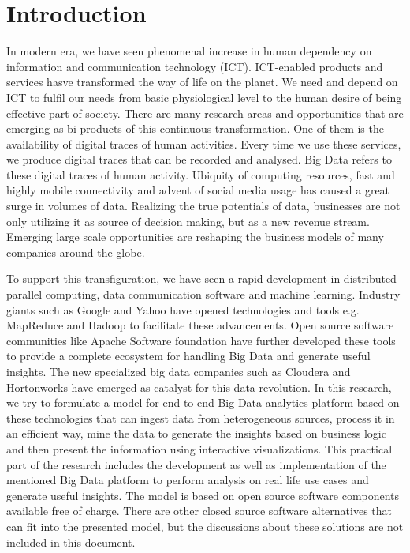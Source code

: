 \setcounter{page}{1}
\chapter{Introduction}
\label{chapter:intro}

 In modern era, we have seen phenomenal increase in human dependency on information and communication technology (ICT). ICT-enabled products and services hasve transformed the way of life on the planet. We need and depend on ICT to fulfil our needs from basic physiological level to the human desire of being effective part of society. There are many research areas and opportunities that are emerging as bi-products of this continuous transformation. One of them is the availability of digital traces of human activities. Every time we use these services, we produce digital traces that can be recorded and analysed. Big Data refers to these digital traces of human activity. Ubiquity of computing resources, fast and highly mobile connectivity and advent of social media usage has caused a great surge in volumes of data. Realizing the true potentials of data, businesses are not only utilizing it as source of decision making, but as a new revenue stream. Emerging large scale opportunities are reshaping the business models of many companies around the globe.
 
To support this transfiguration, we have seen a rapid development in distributed parallel computing, data communication software and machine learning. Industry giants such as Google and Yahoo have opened technologies and tools e.g. MapReduce and Hadoop to facilitate these advancements. Open source software communities like Apache Software foundation have further developed these tools to provide a complete ecosystem for handling Big Data and generate useful insights. The new specialized big data companies such as Cloudera and Hortonworks have emerged as catalyst for this data revolution. In this research, we try to formulate a model for end-to-end Big Data analytics platform based on these technologies that can ingest data from heterogeneous sources, process it in an efficient way, mine the data to generate the insights based on business logic and then present the information using interactive visualizations. This practical part of the research includes the development as well as implementation of the mentioned Big Data platform to perform analysis on real life use cases and generate useful insights. The model is based on open source software components available free of charge. There are other closed source software alternatives that can fit into the presented model, but the discussions about these solutions are not included in this document.


